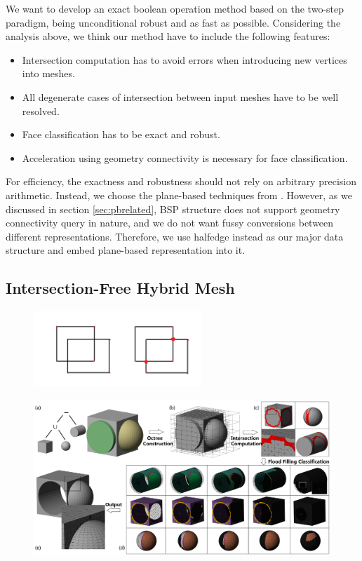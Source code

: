 \documentclass[10pt,journal,compsoc]{IEEEtran}
\begin{document}
We want to develop an exact boolean operation method based on the two-step paradigm, being unconditional robust and as fast as possible. Considering the analysis above, we think our method have to include the following features:
\begin{itemize}
    \item Intersection computation has to avoid errors when introducing new vertices into meshes.
    \item All degenerate cases of intersection between input meshes have to be well resolved.
    \item Face classification has to be exact and robust.
    \item Acceleration using geometry connectivity is necessary for face classification.
\end{itemize}

For efficiency, the exactness and robustness should not rely on arbitrary precision arithmetic. Instead, we choose the plane-based techniques from \cite{campen2010exact}. However, as we discussed in section \ref{sec:pbrelated}, BSP structure does not support geometry connectivity query in nature, and we do not want fussy conversions between different representations. Therefore, we use halfedge instead as our major data structure and embed plane-based representation into it.

\subsection{Intersection-Free Hybrid Mesh}

\begin{figure}[t]
\centering
\includegraphics[width=2.5in]{linkedhalfedge}
\caption{{\color{red}{Sketch: The Linked Halfedge structure}}}
\label{fig:linkedhalfedge}
\end{figure}


\begin{figure}[!t]
\centering
\includegraphics[width=7.1in]{flowchart}
\caption{{\color{red}{Sketch: overview, will be replaced}}}
\label{fig:overview}
\end{figure}
\end{document}
